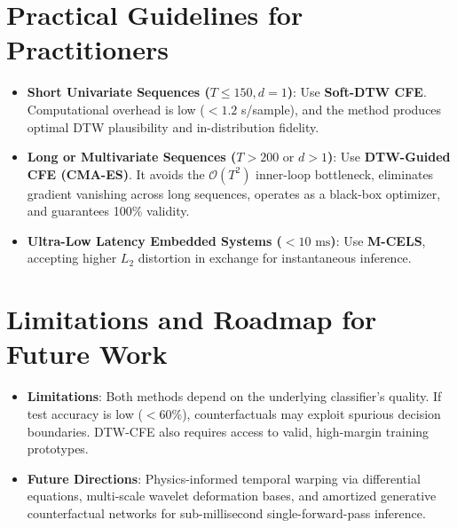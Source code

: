 \documentclass[11pt,a4paper]{report}
\begin{document}
\section{Practical Guidelines for Practitioners}
\begin{itemize}
    \item \textbf{Short Univariate Sequences ($T \le 150, d = 1$)}: Use \textbf{Soft-DTW CFE}. Computational overhead is low ($< 1.2$ s/sample), and the method produces optimal DTW plausibility and in-distribution fidelity.
    \item \textbf{Long or Multivariate Sequences ($T > 200 \text{ or } d > 1$)}: Use \textbf{DTW-Guided CFE (CMA-ES)}. It avoids the $\mathcal{O}(T^2)$ inner-loop bottleneck, eliminates gradient vanishing across long sequences, operates as a black-box optimizer, and guarantees 100\% validity.
    \item \textbf{Ultra-Low Latency Embedded Systems ($< 10\text{ ms}$)}: Use \textbf{M-CELS}, accepting higher $L_2$ distortion in exchange for instantaneous inference.
\end{itemize}

\section{Limitations and Roadmap for Future Work}
\begin{itemize}
    \item \textbf{Limitations}: Both methods depend on the underlying classifier's quality. If test accuracy is low ($< 60\%$), counterfactuals may exploit spurious decision boundaries. DTW-CFE also requires access to valid, high-margin training prototypes.
    \item \textbf{Future Directions}: Physics-informed temporal warping via differential equations, multi-scale wavelet deformation bases, and amortized generative counterfactual networks for sub-millisecond single-forward-pass inference.
\end{itemize}
\end{document}
